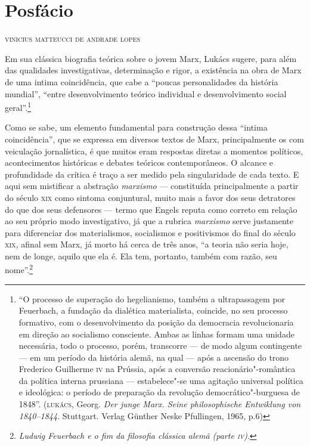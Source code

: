 \pagebreak
\thispagestyle{empty}
\movetooddpage
\chapter[Posfácio, \emph{por Vinicius Matteucci de Andrade Lopes}]{Posfácio }

\begin{flushright}
\textsc{vinicius matteucci de andrade lopes}
\end{flushright}

\noindent{}Em sua clássica biografia teórica sobre o jovem Marx, Lukács sugere,
para além das qualidades investigativas, determinação e rigor, a
existência na obra de Marx de uma intima coincidência, que cabe a
``poucas personalidades da história mundial'', ``entre desenvolvimento
teórico individual e desenvolvimento social geral''.\footnote{``O
  processo de superação do hegelianismo, também a ultrapassagem por
  Feuerbach, a fundação da dialética materialista, coincide, no seu
  processo formativo, com o desenvolvimento da posição da democracia
  revolucionaria em direção ao socialismo consciente. Ambas as linhas
  formam uma unidade necessária, todo o processo, porém, transcorre ---
  de modo algum contingente --- em um período da história alemã, na qual
  --- após a ascensão do trono Frederico Guilherme \textsc{iv} na
  Prússia, após a conversão reacionário"-romântica da política interna
  prussiana --- estabelece"-se uma agitação universal política e
  ideológica: o período de preparação da revolução democrático"-burguesa
  de 1848''. (\textsc{lukács}, Georg. \emph{Der junge Marx. Seine
  philosophische Entwiklung von 1840--1844}. Stuttgart. Verlag Günther
  Neske Pfullingen, 1965, p.6)}

Como se sabe, um elemento fundamental para construção dessa ``intima
coincidência'', que se expressa em diversos textos de Marx,
principalmente os com veiculação jornalística, é que muitos eram
respostas diretas a momentos políticos, acontecimentos históricas e
debates teóricos contemporâneos. O alcance e profundidade da crítica é
traço a ser medido pela singularidade de cada texto. E aqui sem
mistificar a abstração \emph{marxismo} --- constituída principalmente a
partir do século \textsc{xix} como sintoma conjuntural, muito mais a
favor dos seus detratores do que dos seus defensores --- termo que
Engels reputa como correto em relação ao seu próprio modo investigativo,
já que a rubrica \emph{marxismo} serve justamente para diferenciar dos
materialismos, socialismos e positivismos do final do século
\textsc{xix}, afinal sem Marx, já morto há cerca de três anos, ``a
teoria não seria hoje, nem de longe, aquilo que ela é. Ela tem,
portanto, também com razão, seu nome''.\footnote{\emph{Ludwig Feuerbach
  e o fim da filosofia clássica alemã (parte \textsc{iv})}.}

